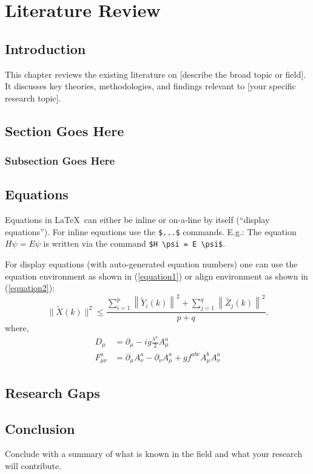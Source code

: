\chapter{Literature Review}
\label{chap:literature_review}
\section{Introduction}
This chapter reviews the existing literature on [describe the broad topic or field]. It discusses key theories, methodologies, and findings relevant to [your specific research topic]. 
\section{Section Goes Here}
\subsection{Subsection Goes Here}
\section{Equations}
Equations in \LaTeX\ can either be inline or on-a-line by itself (``display equations''). For
inline equations use the \verb+$...$+ commands. E.g.: The equation
$H\psi = E \psi$ is written via the command \verb+$H \psi = E \psi$+.

For display equations (with auto-generated equation numbers)
one can use the equation environment as shown in (\ref{equation1}) or align environment as shown in (\ref{equation2}):
\begin{equation}
\label{equation1}
\|\tilde{X}(k)\|^2 \leq\frac{\sum\limits_{i=1}^{p}\left\|\tilde{Y}_i(k)\right\|^2+\sum\limits_{j=1}^{q}\left\|\tilde{Z}_j(k)\right\|^2 }{p+q}.
\end{equation}
where,
\begin{align}
D_\mu &=  \partial_\mu - ig \frac{\lambda^a}{2} A^a_\mu \nonumber \\
F^a_{\mu\nu} &= \partial_\mu A^a_\nu - \partial_\nu A^a_\mu + g f^{abc} A^b_\mu A^a_\nu \label{equation2}
\end{align}
\section{Research Gaps}
\section{Conclusion}
Conclude with a summary of what is known in the field and what your research will contribute.
